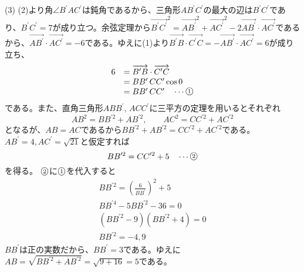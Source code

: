\documentclass[dvipdfmx,autodetect-engine]{jsarticle}
\begin{document}
(3)
 (2)より角$\angle B^\prime A C^\prime$は鈍角であるから、三角形$A B^\prime C^\prime$の最大の辺は$B^\prime C^\prime$であり、$B^\prime C^\prime = 7$が成り立つ。余弦定理から$\overrightarrow{B^\prime C^\prime}^2=\overrightarrow{AB^\prime}^2+\overrightarrow{AC^\prime}^2-2\overrightarrow{AB^\prime}\cdot\overrightarrow{AC^\prime}$であるから、$\overrightarrow{AB^\prime}\cdot\overrightarrow{AC^\prime}=-6$である。ゆえに(1)より$\overrightarrow{B^\prime B}\cdot\overrightarrow{C^\prime C}=-\overrightarrow{AB^\prime}\cdot\overrightarrow{AC^\prime}=6$が成り立ち、
 \renewcommand{\arraystretch}{1.2}
\[
\begin{array}{rl}
6&=\overrightarrow{B^\prime B}\cdot\overrightarrow{C^\prime C}\\
 &=BB^\prime \,CC^\prime\cos 0\\
 &=B B^\prime \,C C^\prime \quad\cdots \raise0.2ex\hbox{\textcircled{\scriptsize{1}}}
\end{array}
\]
である。また、直角三角形$ABB^\prime,\, ACC^\prime$に三平方の定理を用いるとそれぞれ\[
AB^2=BB^{\prime 2}+AB^{\prime 2},\qquad AC^2=CC^{\prime 2}+AC^{\prime 2}\]
となるが、$AB=AC$であるから$BB^{\prime 2}+AB^{\prime 2}=CC^{\prime 2}+AC^{\prime 2}$である。$AB^{\prime}=4, AC^{\prime}=\sqrt{21}$と仮定すれば\[
BB^{\prime 2}=CC^{\prime 2}+5\quad\cdots \raise0.2ex\hbox{\textcircled{\scriptsize{2}}}\]を得る。
$\raise0.2ex\hbox{\textcircled{\scriptsize{2}}}$に$\raise0.2ex\hbox{\textcircled{\scriptsize{1}}}$を代入すると
\renewcommand{\arraystretch}{1.7}
\[
\begin{array}{c}
BB^{\prime 2}=\displaystyle\left(\frac{6}{BB^{\prime}}\right)^{\!\!2}+5\\
BB^{\prime 4}-5BB^{\prime 2}-36=0\\
(BB^{\prime 2}-9)(BB^{\prime 2}+4)=0\\
BB^{\prime 2}=-4, 9
\end{array}
\]$BB^{\prime}$は正の実数だから、$BB^{\prime}=3$である。ゆえに$AB=\sqrt{BB^{\prime 2}+AB^{\prime 2}}=\sqrt{9+16}=5$である。
\renewcommand{\arraystretch}{1.0}
\end{document}
